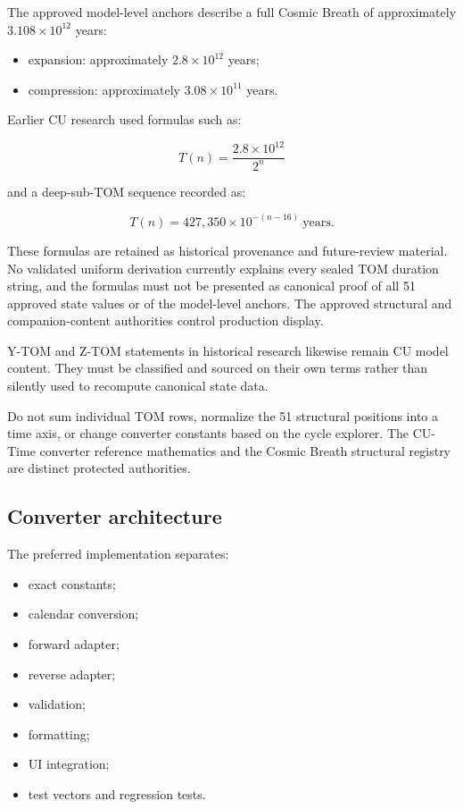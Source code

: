 \documentclass[11pt,letterpaper]{article}
\begin{document}
The approved model-level anchors describe a full Cosmic Breath of approximately
\(3.108\times 10^{12}\) years:

\begin{itemize}
    \item expansion: approximately \(2.8\times 10^{12}\) years;
    \item compression: approximately \(3.08\times 10^{11}\) years.
\end{itemize}

Earlier CU research used formulas such as:

\[
T(n)=\frac{2.8\times10^{12}}{2^n}
\]

and a deep-sub-TOM sequence recorded as:

\[
T(n)=427{,}350\times 10^{-(n-16)}\ \mathrm{years}.
\]

These formulas are retained as historical provenance and future-review material.
No validated uniform derivation currently explains every sealed TOM duration
string, and the formulas must not be presented as canonical proof of all 51
approved state values or of the model-level anchors. The approved structural
and companion-content authorities control production display.

Y-TOM and Z-TOM statements in historical research likewise remain CU model
content. They must be classified and sourced on their own terms rather than
silently used to recompute canonical state data.

\begin{safetybox}
Do not sum individual TOM rows, normalize the 51 structural positions into a
time axis, or change converter constants based on the cycle explorer. The
CU-Time converter reference mathematics and the Cosmic Breath structural
registry are distinct protected authorities.
\end{safetybox}

\subsection{Converter architecture}

The preferred implementation separates:

\begin{itemize}
    \item exact constants;
    \item calendar conversion;
    \item forward adapter;
    \item reverse adapter;
    \item validation;
    \item formatting;
    \item UI integration;
    \item test vectors and regression tests.
\end{itemize}
\end{document}

